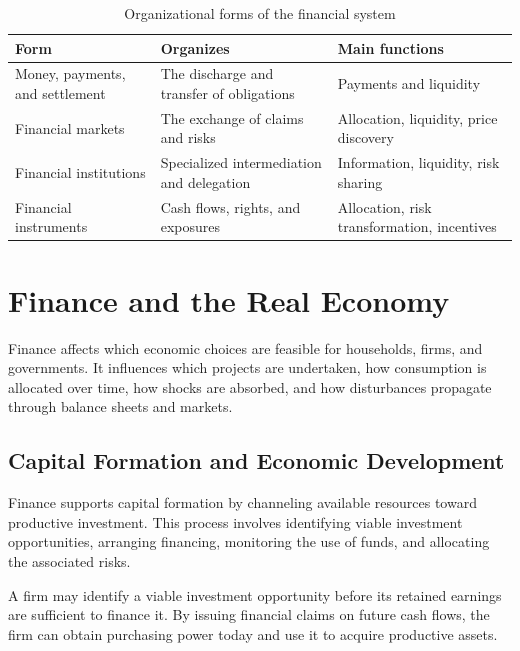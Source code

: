 \begin{table}[H]
\centering

\caption{Organizational forms of the financial system}
\label{tab:ch1-architecture}

\begin{tabularx}{\textwidth}{@{}p{3.0cm}X X@{}}
\toprule
\textbf{Form}
&
\textbf{Organizes}
&
\textbf{Main functions}
\\
\midrule

Money, payments, and settlement
&
The discharge and transfer of obligations
&
Payments and liquidity
\\

Financial markets
&
The exchange of claims and risks
&
Allocation, liquidity, price discovery
\\

Financial institutions
&
Specialized intermediation and delegation
&
Information, liquidity, risk sharing
\\

Financial instruments
&
Cash flows, rights, and exposures
&
Allocation, risk transformation, incentives
\\

\bottomrule
\end{tabularx}

\end{table}

\section{Finance and the Real Economy}

Finance affects which economic choices are feasible for households, firms, and governments. It influences which projects are undertaken, how consumption is allocated over time, how shocks are absorbed, and how disturbances propagate through balance sheets and markets.

\subsection{Capital Formation and Economic Development}

Finance supports capital formation by channeling available resources toward productive investment. This process involves identifying viable investment opportunities, arranging financing, monitoring the use of funds, and allocating the associated risks.

A firm may identify a viable investment opportunity before its retained earnings are sufficient to finance it. By issuing financial claims on future cash flows, the firm can obtain purchasing power today and use it to acquire productive assets.

